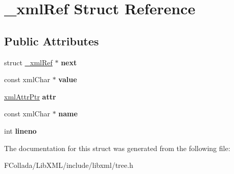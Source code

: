 \hypertarget{struct__xmlRef}{
\section{\_\-xmlRef Struct Reference}
\label{struct__xmlRef}
}
\subsection*{Public Attributes}
\begin{DoxyCompactItemize}
\item 
\hypertarget{struct__xmlRef_a11ced87eb876462aefdaad07b6216e32}{
struct \hyperlink{struct__xmlRef}{\_\-xmlRef} $\ast$ {\bfseries next}}
\label{struct__xmlRef_a11ced87eb876462aefdaad07b6216e32}

\item 
\hypertarget{struct__xmlRef_ac28785f779ebfd41e264c9e9e91e6660}{
const xmlChar $\ast$ {\bfseries value}}
\label{struct__xmlRef_ac28785f779ebfd41e264c9e9e91e6660}

\item 
\hypertarget{struct__xmlRef_a3ff97e4e127f1749ab2e59fdec0f8a8e}{
\hyperlink{struct__xmlAttr}{xmlAttrPtr} {\bfseries attr}}
\label{struct__xmlRef_a3ff97e4e127f1749ab2e59fdec0f8a8e}

\item 
\hypertarget{struct__xmlRef_a54973d491748936cc306713782f4f467}{
const xmlChar $\ast$ {\bfseries name}}
\label{struct__xmlRef_a54973d491748936cc306713782f4f467}

\item 
\hypertarget{struct__xmlRef_aa9d570e7f96cc7647c9b7fe96fc10eca}{
int {\bfseries lineno}}
\label{struct__xmlRef_aa9d570e7f96cc7647c9b7fe96fc10eca}

\end{DoxyCompactItemize}


The documentation for this struct was generated from the following file:\begin{DoxyCompactItemize}
\item 
FCollada/LibXML/include/libxml/tree.h\end{DoxyCompactItemize}
